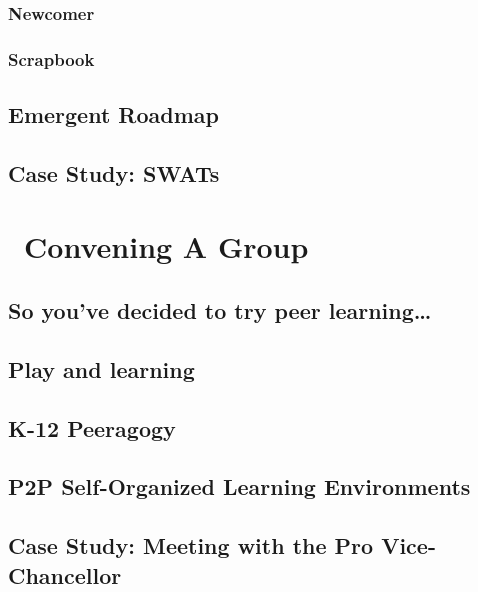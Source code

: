 \documentclass[ebook, 12pt, twoside]{memoir}
\begin{document}
\section{Newcomer} \label{sec:Newcomer}

%
\section{Scrapbook} \label{sec:Scrapbook}




\chapter{Emergent Roadmap} \label{sec:Distributed_Roadmap}
 

\renewcommand*{\footnote}[1]{\oldfootnote{#1}}%
\renewcommand*{\textsuperscript}[1]{\oldtextsuperscript{#1}}%

\chapter{Case Study: SWATs} \label{swats}


\part{~Convening A Group} \label{convening-part} %
%
\chapter[\textbf{So you've decided to try peer learning\ldots}]{So you've decided to try peer learning\ldots}

%
\chapter[\textbf{Play and learning}]{Play and learning}
%

%
\chapter[\textbf{K-12 Peeragogy}]{K-12 Peeragogy}
%

%
\chapter[\textbf{P2P SOLE}]{P2P Self-Organized Learning Environments}
%

%
\chapter[\textbf{Case Study: Meeting with the Pro Vice-Chancellor}]{ Case Study: Meeting with the Pro Vice-Chancellor}
%

\end{document}

